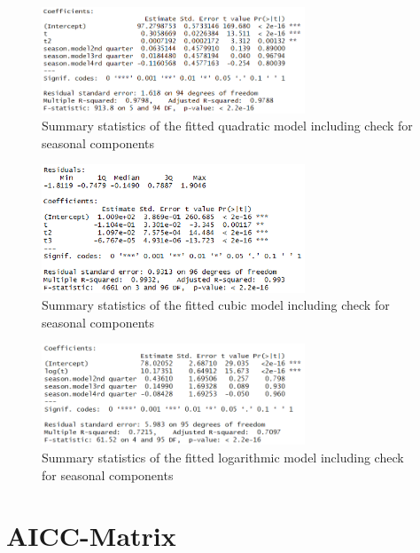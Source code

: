 \documentclass[11pt,a4paper]{article}
\begin{document}
\begin{figure}[H]
    \centering
    \includegraphics[width=0.7\textwidth]{summary_quadraticmodel}
    \caption{Summary statistics of the fitted quadratic model including check for seasonal components}
    \label{fig:summary_quadraticmodel}
\end{figure}

\begin{figure}[H]
    \centering
    \includegraphics[width=0.7\textwidth]{summary_cubicmodel}
    \caption{Summary statistics of the fitted cubic model including check for seasonal components}
    \label{fig:summary_cubicmodel}
\end{figure}

\begin{figure}[H]
    \centering
    \includegraphics[width=0.7\textwidth]{summary_logmodel}
    \caption{Summary statistics of the fitted logarithmic model including check for seasonal components}
    \label{fig:summary_logmodel}
\end{figure}



\section{AICC-Matrix}
\label{sec:aicc_matrix}
\end{document}
